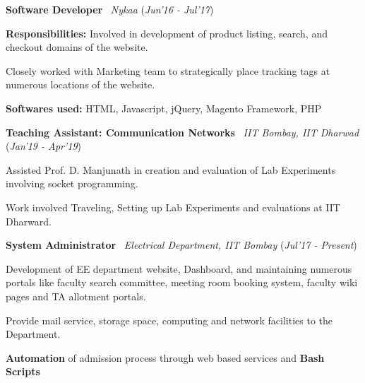 \documentclass[10pt]{article}
\newcommand{\highlight}[1]{\framecolorbox[\textwidth]{black}{bl}{\makebox[\textwidth][l]{\bfseries \color{black} #1}}}
\newcommand{\mystyle}[1]{\textit{\textit{\textcolor{llb}{#1}}}}
\begin{document}
	\highlight{WORK EXPERIENCE}
	\begin{myitemize}
		\item \textbf{Software Developer} \textpipe\ \mystyle{Nykaa} \hfill{(\textit{Jun'16 - Jul'17})}
		\begin{myitemize}
			\item \textbf{Responsibilities:} Involved in development of product listing, search, and checkout domains of the website.
			\item Closely worked with Marketing team to strategically place tracking tags at numerous locations of the website.
			\item \textbf{Softwares used:} HTML, Javascript, jQuery, Magento Framework, PHP
		\end{myitemize}

		\item \textbf{Teaching Assistant: Communication Networks} \textpipe\ \mystyle{IIT Bombay, IIT Dharwad} \hfill{(\textit{Jan'19 - Apr'19})}
		\begin{myitemize}
			\item Assisted Prof. D. Manjunath in creation and evaluation of Lab Experiments involving socket programming.
			\item Work involved Traveling, Setting up Lab Experiments and evaluations at IIT Dharward.
		\end{myitemize}

		\item \textbf{System Administrator} \textpipe\ \mystyle{Electrical Department, IIT Bombay} \hfill{(\textit{Jul'17 - Present})}
		\begin{myitemize}
			\item Development of EE department website, Dashboard, and maintaining numerous portals like faculty search committee, meeting room booking system, faculty wiki pages and TA allotment portals.
			\item Provide mail service, storage space, computing and network facilities to the Department.
			\item \textbf{Automation} of admission process through web based services and \textbf{Bash Scripts}
		\end{myitemize}
	\end{myitemize}
\end{document}
